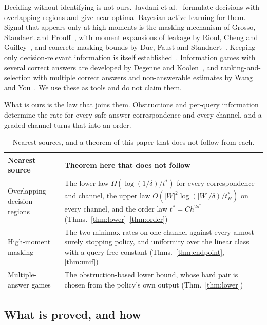 Deciding without identifying is not ours. Javdani et al.~\cite{javdani2014} formulate decisions
with overlapping regions and give near-optimal Bayesian active learning for them. Signal that
appears only at high moments is the masking mechanism of Grosso, Standaert and
Prouff~\cite{grosso2014}, with moment expansions of leakage by Rioul, Cheng and
Guilley~\cite{rioul2021}, and concrete masking bounds by Duc, Faust and Standaert~\cite{duc2015}.
Keeping only decision-relevant information is itself established~\cite{poli2023}. Information
games with several correct answers are developed by Degenne and Koolen~\cite{degenne2019}, and
ranking-and-selection with multiple correct answers and non-answerable estimates by Wang and
You~\cite{wangyou2026}. We use these as tools and do not claim them.

What is ours is the law that joins them. Obstructions and per-query information determine the
rate for every safe-answer correspondence and every channel, and a graded channel turns that
into an order.

\begin{table}[h]
\caption{Nearest sources, and a theorem of this paper that does not follow from each.}
\label{tab:prior}
\centering
\footnotesize
\begin{tabular}{@{}p{}p{}@{}}
\toprule
Nearest source & Theorem here that does not follow \\
\midrule
Overlapping decision regions~\cite{javdani2014} & The lower law $\Omega(\log(1/\delta)/t^{*})$
for every correspondence and channel, the upper law $O(|W|^{2}\log(|W|/\delta)/t^{*}_{H})$ on every
channel, and the order law $t^{*}=Ch^{2s^{*}}$ (Thms.~\ref{thm:lower}--\ref{thm:order}) \\
High-moment masking~\cite{grosso2014,duc2015} & The two minimax rates on one channel against
every almost-surely stopping policy, and uniformity over the linear class with a
query-free constant (Thms.~\ref{thm:endpoint}, \ref{thm:unif}) \\
Multiple-answer games~\cite{degenne2019,wangyou2026} & The obstruction-based lower bound, whose
hard pair is chosen from the policy's own output (Thm.~\ref{thm:lower}) \\
\bottomrule
\end{tabular}
\end{table}

\subsection{What is proved, and how}

